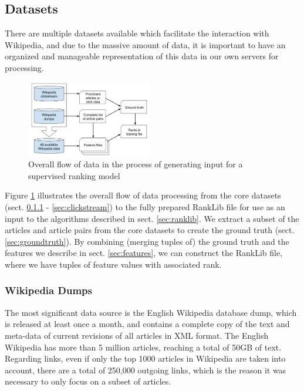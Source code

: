 \subsection{Datasets}

There are multiple datasets available which facilitate the interaction with Wikipedia, and due to the massive amount of data, it is important to have an organized and manageable representation of this data in our own servers for processing. 

\begin{figure}[H]
  \centering \includegraphics[width=0.49\textwidth]{images/process_small}
  \caption{Overall flow of data in the process of generating input for a supervised ranking model}
  \label{fig:process}
\end{figure}

Figure \ref{fig:process} illustrates the overall flow of data processing from the core datasets (sect. \ref{sec:wikidump} - \ref{sec:clickstream}) to the fully prepared RankLib file for use as an input to the algorithms described in sect. \ref{sec:ranklib}. We extract a subset of the articles and article pairs from the core datasets to create the ground truth (sect. \ref{sec:groundtruth}). By combining (merging tuples of) the ground truth and the features we describe in sect. \ref{sec:features}, we can construct the RankLib file, where we have tuples of feature values with associated rank.
%
%
%
%
%

\subsubsection{Wikipedia Dumps}
\label{sec:wikidump}
The most significant data source is the English Wikipedia database dump, which is released at least once a month, and contains a complete copy of the text and meta-data of current revisions of all articles in XML format. The English Wikipedia has more than 5 million articles, reaching a total of 50GB of text. Regarding links, even if only the top 1000 articles in Wikipedia are taken into account, there are a total of 250,000 outgoing links, which is the reason it was necessary to only focus on a subset of articles.

